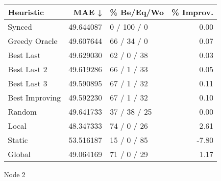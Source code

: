 \begin{tabular}{lrlr}
\toprule
      Heuristic &      MAE ↓ &    \% Be/Eq/Wo & \% Improv. \\
\midrule
         Synced &  49.644087 &   0 / 100 / 0 &      0.00 \\
  Greedy Oracle &  49.607644 &   66 / 34 / 0 &      0.07 \\
      Best Last &  49.629030 &   62 / 0 / 38 &      0.03 \\
    Best Last 2 &  49.619286 &   66 / 1 / 33 &      0.05 \\
    Best Last 3 &  49.590895 &   67 / 1 / 32 &      0.11 \\
 Best Improving &  49.592230 &   67 / 1 / 32 &      0.10 \\
         Random &  49.641733 &  37 / 38 / 25 &      0.00 \\
          Local &  48.347333 &   74 / 0 / 26 &      2.61 \\
         Static &  53.516187 &   15 / 0 / 85 &     -7.80 \\
         Global &  49.064169 &   71 / 0 / 29 &      1.17 \\
\bottomrule
\end{tabular}
\caption{Node 2}
\label{tab:non_lr001_le1_bs2_2}
